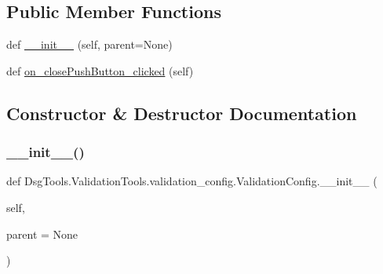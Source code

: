 \subsection*{Public Member Functions}
\begin{DoxyCompactItemize}
\item 
def \mbox{\hyperlink{class_dsg_tools_1_1_validation_tools_1_1validation__config_1_1_validation_config_a50efdd96364ee73a5ca76dd868a3cb11}{\+\_\+\+\_\+init\+\_\+\+\_\+}} (self, parent=None)
\item 
def \mbox{\hyperlink{class_dsg_tools_1_1_validation_tools_1_1validation__config_1_1_validation_config_abd8829244c6371f975c074914d8770ca}{on\+\_\+close\+Push\+Button\+\_\+clicked}} (self)
\end{DoxyCompactItemize}


\subsection{Constructor \& Destructor Documentation}
\mbox{\label{class_dsg_tools_1_1_validation_tools_1_1validation__config_1_1_validation_config_a50efdd96364ee73a5ca76dd868a3cb11}} 
\subsubsection{\texorpdfstring{\+\_\+\+\_\+init\+\_\+\+\_\+()}{\_\_init\_\_()}}
{\footnotesize\ttfamily def Dsg\+Tools.\+Validation\+Tools.\+validation\+\_\+config.\+Validation\+Config.\+\_\+\+\_\+init\+\_\+\+\_\+ (\begin{DoxyParamCaption}\item[{}]{self,  }\item[{}]{parent = {\ttfamily None} }\end{DoxyParamCaption})}

